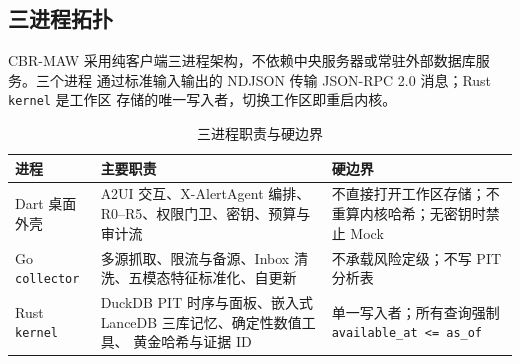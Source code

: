 \documentclass[UTF8,fontset=fandol,11pt,a4paper]{ctexart}
\begin{document}
\subsection{三进程拓扑}

CBR-MAW 采用纯客户端三进程架构，不依赖中央服务器或常驻外部数据库服务。三个进程
通过标准输入输出的 NDJSON 传输 JSON-RPC 2.0 消息；Rust \texttt{kernel} 是工作区
存储的唯一写入者，切换工作区即重启内核。

\begin{table}[t]
\centering
\caption{三进程职责与硬边界}
\label{tab:processes}
\footnotesize
\begin{tabular}{>{\raggedright\arraybackslash}p{2.4cm}
                >{\raggedright\arraybackslash}p{5.4cm}
                >{\raggedright\arraybackslash}p{6.2cm}}
\toprule
进程 & 主要职责 & 硬边界 \\
\midrule
Dart 桌面外壳 & A2UI 交互、X-AlertAgent 编排、R0--R5、权限门卫、密钥、预算与审计流 &
不直接打开工作区存储；不重算内核哈希；无密钥时禁止 Mock \\
Go \texttt{collector} & 多源抓取、限流与备源、Inbox 清洗、五模态特征标准化、自更新 &
不承载风险定级；不写 PIT 分析表 \\
Rust \texttt{kernel} & DuckDB PIT 时序与面板、嵌入式 LanceDB 三库记忆、确定性数值工具、
黄金哈希与证据 ID & 单一写入者；所有查询强制 \texttt{available\_at <= as\_of} \\
\bottomrule
\end{tabular}
\end{table}
\end{document}
